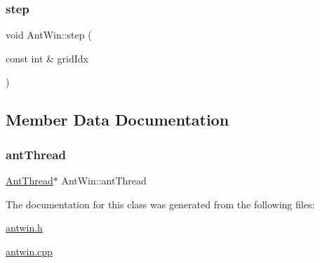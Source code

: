 \mbox{\label{classAntWin_a1f961a07c7e07c0ec186438eee1f0ef8}} 
\subsubsection{\texorpdfstring{step}{step}}
{\footnotesize\ttfamily void Ant\+Win\+::step (\begin{DoxyParamCaption}\item[{const int \&}]{grid\+Idx }\end{DoxyParamCaption})\hspace{0.3cm}{\ttfamily [slot]}}



\subsection{Member Data Documentation}
\mbox{\label{classAntWin_a7737ac6531de9aadb9922bea7ffa716b}} 
\subsubsection{\texorpdfstring{ant\+Thread}{antThread}}
{\footnotesize\ttfamily \hyperlink{classAntThread}{Ant\+Thread}$\ast$ Ant\+Win\+::ant\+Thread}



The documentation for this class was generated from the following files\+:\begin{DoxyCompactItemize}
\item 
\hyperlink{antwin_8h}{antwin.\+h}\item 
\hyperlink{antwin_8cpp}{antwin.\+cpp}\end{DoxyCompactItemize}
